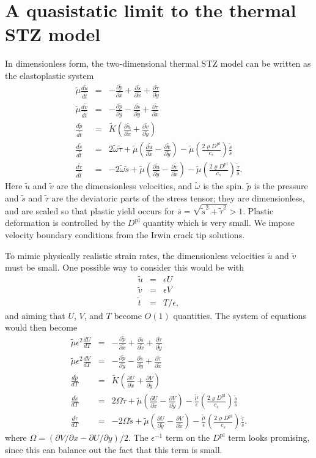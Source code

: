 \documentclass[12pt]{article}
\newcommand{\p}{\partial}
\newcommand{\Dpl}{D^\textrm{pl}}
\newcommand{\tT}{\tilde{t}}
\newcommand{\xT}{\tilde{x}}
\newcommand{\yT}{\tilde{y}}
\newcommand{\uT}{\tilde{u}}
\newcommand{\vT}{\tilde{v}}
\newcommand{\KT}{\tilde{K}}
\newcommand{\pT}{\tilde{p}}
\newcommand{\sT}{\tilde{s}}
\newcommand{\tauT}{\tilde{\tau}}
\newcommand{\muT}{\tilde{\mu}}
\newcommand{\drtT}[1]{\frac{d #1}{d \tT}}
\newcommand{\prxT}[1]{\frac{\p #1}{\p \xT}}
\newcommand{\pryT}[1]{\frac{\p #1}{\p \yT}}
\newcommand{\bs}{\bar{s}}
\begin{document}
\section*{A quasistatic limit to the thermal STZ model}
In dimensionless form, the two-dimensional thermal STZ model can be written as
the elastoplastic system
\begin{eqnarray}
  \muT \drtT{\uT}&=&-\prxT{\pT}+\prxT{\sT}+\pryT{\tauT} \\
  \muT \drtT{\vT}&=&-\pryT{\pT}-\pryT{\sT}+\prxT{\tauT} \\
  \drtT{\pT} &=& \KT \left(\prxT{\uT} +\pryT{\vT}\right) \\
  \drtT{\sT} &=& 2\tilde{\omega} \tauT + \muT\left( \prxT{\uT} - \pryT{\vT} \right) - \muT \left(\frac{2 \varrho \Dpl}{c_s}\right) \frac{\sT}{\bs} \\
  \drtT{\tauT} &=& - 2\tilde{\omega} \sT + \muT \left( \pryT{\uT} - \prxT{\vT} \right) - \muT \left(\frac{2 \varrho \Dpl}{c_s}\right) \frac{\tauT}{\bs}.
\end{eqnarray}
Here $\uT$ and $\vT$ are the dimensionless velocities, and $\tilde{\omega}$ is
the spin. $\pT$ is the pressure and $\sT$ and $\tauT$ are the deviatoric parts
of the stress tensor; they are dimensionless, and are scaled so that plastic
yield occurs for $\bar{s}=\sqrt{\sT^2+\tauT^2}>1$. Plastic deformation is controlled by
the $\Dpl$ quantity which is very small. We impose velocity boundary conditions
from the Irwin crack tip solutions.

To mimic physically realistic strain rates, the dimensionless velocities $\uT$
and $\vT$ must be small. One possible way to consider this would be with
\begin{eqnarray*}
\uT &=& \epsilon U \\
\vT &=& \epsilon V \\
\tT &=& T/\epsilon,
\end{eqnarray*}
and aiming that $U$, $V$, and $T$ become $O(1)$ quantities. The system of
equations would then become 
\begin{eqnarray}
  \label{eq:eps_u} \muT \epsilon^2 \frac{dU}{dT}&=&-\prxT{\pT}+\prxT{\sT}+\pryT{\tauT} \\
  \label{eq:eps_v} \muT \epsilon^2 \frac{dV}{dT}&=&-\pryT{\pT}-\pryT{\sT}+\prxT{\tauT} \\
  \frac{d\pT}{dT} &=& \KT \left(\prxT{U} +\pryT{V}\right) \\
  \frac{d\sT}{dT} &=& 2\Omega \tauT + \muT \left( \prxT{U} - \pryT{V} \right) - \frac{\muT}{\epsilon} \left(\frac{2 \varrho \Dpl}{c_s}\right) \frac{\sT}{\bs} \\
  \frac{d\tauT}{dT} &=& - 2\Omega \sT + \muT \left( \pryT{U} - \prxT{V} \right) - \frac{\muT}{\epsilon} \left(\frac{2 \varrho \Dpl}{c_s}\right) \frac{\tauT}{\bs}.
\end{eqnarray}
where $\Omega= (\p V /\p x - \p U / \p y)/2$. The $\epsilon^{-1}$ term on
the $\Dpl$ term looks promising, since this can balance out the fact
that this term is small.
\end{document}
